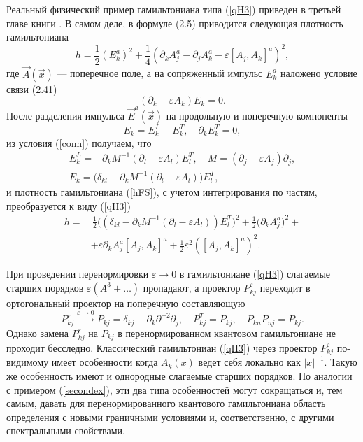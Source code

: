 \documentclass[12pt]{article}
\newcommand{\pl}{\partial}
\newcommand{\ve}{\varepsilon}
\begin{document}
    Реальный физический пример гамильтониана типа
(\ref{qH3})
    приведен в третьей главе книги
\cite{FS}.
    В самом деле, в формуле
(2.5)
    приводится следующая плотность гамильтониана
\begin{equation}
\label{hFS}
    h = \frac{1}{2} (E_{k}^{a})^{2} + \frac{1}{4}
	(\partial_{k}A_{j}^{a} - \partial_{j}A_{k}^{a}
	    - \ve [A_{j},A_{k}]^{a})^{2} ,
\end{equation}
    где
$ \vec{A}(\vec{x}) $ --- поперечное поле, а на сопряженный импульс
$ E_{k}^{a} $
    наложено условие связи (2.41)
\begin{equation}
\label{conn}
    (\partial_{k} - \ve A_{k}) E_{k} = 0 .
\end{equation}
    После разделения импульса
$ \vec{E}^{a}(\vec{x}) $
    на продольную и поперечную компоненты
\begin{equation*}
    E_{k} = E_{k}^{L} + E_{k}^{T} ,\quad \partial_{k} E_{k}^{T} = 0,
\end{equation*}
    из условия
(\ref{conn})
    получаем, что
\begin{gather*}
    E_{k}^{L} = - \partial_{k} M^{-1} (\partial_{l} -\ve A_{l}) E_{l}^{T},
    \quad M = (\partial_{j} - \ve A_{j})\partial_{j} , \\
    E_{k} = \bigl(\delta_{kl}
	- \partial_{k} M^{-1} (\partial_{l} -\ve A_{l})\bigr) E_{l}^{T},
\end{gather*}
    и плотность гамильтониана
(\ref{hFS}),
    с учетом интегрирования по частям, преобразуется к виду
(\ref{qH3})
\begin{align*}
    h =& \,\frac{1}{2} \bigl( (\delta_{kl}
	- \partial_{k} M^{-1} (\partial_{l} -\ve A_{l}) ) E_{l}^{T} \bigr)^{2}
	+ \frac{1}{2} \bigl( \partial_{k}A_{j}^{a} \bigr)^{2} +\\
	&+ \ve \partial_{k}A_{j}^{a} [A_{j}, A_{k}]^{a}
	+\frac{1}{2} \ve^{2} ([A_{j},A_{k}]^{a})^{2} .
\end{align*}

    При проведении перенормировки
$ \ve \to 0 $
    в гамильтониане
(\ref{qH3})
    слагаемые старших порядков
$ \ve (A^{3}+\ldots) $
    пропадают, а проектор
$ P_{kj}^{\ve} $
    переходит в ортогональный проектор на поперечную составляющую
\begin{equation}
\label{Plim}
    P_{kj}^{\ve} \stackrel{\ve\to 0}{\rightarrow}
	P_{kj} = \delta_{kj} - \pl_{k} \pl^{-2} \pl_{j} ,\quad
    P_{kj}^{T} = P_{kj} ,\quad P_{kn} P_{nj} = P_{kj} .
\end{equation}
    Однако замена
$ P_{kj}^{\ve} $ на $ P_{kj} $
    в перенормированном квантовом гамильтониане не проходит бесследно.
    Классический гамильтониан
(\ref{qH3})
    через проектор
$ P_{kj}^{\ve} $
    по-видимому имеет особенности когда
$ A_{k}(x) $
    ведет себя локально как
$ |x|^{-1} $.
    Такую же особенность имеют и однородные слагаемые старших порядков.
    По аналогии с примером
(\ref{secondex}),
    эти два типа особенностей могут сокращаться и, тем самым, давать
    для перенормированного квантового гамильтониана область
    определения с новыми граничными условиями и, соответственно, с другими
    спектральными свойствами.
\end{document}
